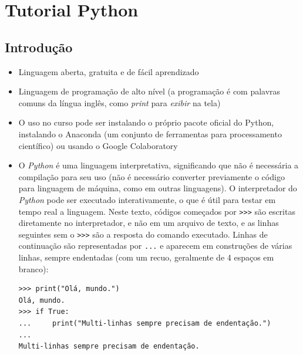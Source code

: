 \chapter{Tutorial Python}\label{ap:python}
\section{Introdução}
\begin{itemize}
	\item Linguagem aberta, gratuita e de fácil aprendizado
	\item Linguagem de programação de alto nível (a programação é com palavras comuns da língua inglês, como \textit{print} para \textit{exibir} na tela)
	\item O uso no curso pode ser instalando o próprio pacote oficial do Python, instalando o Anaconda (um conjunto de ferramentas para processamento científico) ou usando o Google Colaboratory
	\item O \textit{Python} é uma linguagem interpretativa, significando que não é necessária a compilação para seu uso (não é necessário converter previamente o código para linguagem de máquina, como em outras linguagens). O interpretador do \textit{Python} pode ser executado interativamente, o que é útil para testar em tempo real a linguagem. Neste texto, códigos começados por \verb|>>>| são escritas diretamente no interpretador, e não em um arquivo de texto, e as linhas seguintes sem o \verb|>>>| são a resposta do comando executado. Linhas de continuação são representadas por \verb|...| e aparecem em construções de várias linhas, sempre endentadas (com um recuo, geralmente de 4 espaços em branco):
	\begin{verbatim}
>>> print("Olá, mundo.")
Olá, mundo.
>>> if True:
...     print("Multi-linhas sempre precisam de endentação.")
... 
Multi-linhas sempre precisam de endentação.
	\end{verbatim}
\end{itemize}

